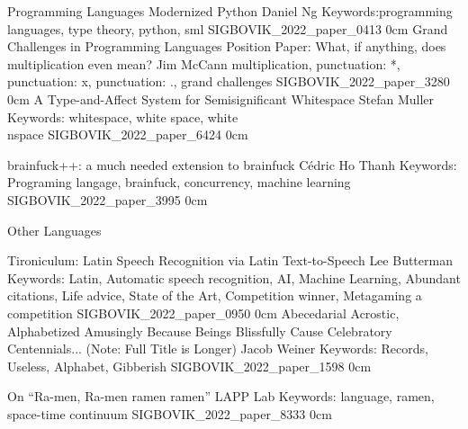 \renewcommand{\thepage}{\roman{page}}
\setcounter{page}{3}

\newpage
\renewcommand{\thepage}{\arabic{page}}
\setcounter{page}{1}

\newcommand{\link}[2][]{\vspace{-1in} {\scriptsize #1 \url{#2}} \raisebox{-0.5\height}{\texttt{[image: participation]}}}
\newcommand{\badge}[1]{\texttt{[image: badges/badge\_\#1]}}
\newcommand{\badges}[1]{\vspace{-1in} \raisebox{-0.5\height}{#1}}

\addtrack
    {}{Programming Languages}
\addpaper
    {Modernized Python}
    {Daniel Ng}
    {Keywords:programming languages, type theory, python, sml}
    {SIGBOVIK_2022_paper_0413}
    {0cm}
    {}
\addpaper
    {Grand Challenges in Programming Languages Position Paper: What, if anything, does multiplication even mean?}
    {Jim McCann}
    {multiplication, punctuation: *, punctuation: x, punctuation: ., grand challenges}
    {SIGBOVIK_2022_paper_3280}
    {0cm}
    {}
\addpaper
    {A Type-and-Affect System for Semisignificant Whitespace}
    {Stefan Muller}
    {Keywords: whitespace, white space, white\\nspace}
    {SIGBOVIK_2022_paper_6424}
    {0cm}
    {}

\addpaper
    {brainfuck++: a much needed extension to brainfuck}
    {Cédric Ho Thanh}
    {Keywords: Programing langage, brainfuck, concurrency, machine learning}
    {SIGBOVIK_2022_paper_3995}
    {0cm}
    {\badges{\badge{pagenumbers}}}

\addtrack
    {}{Other Languages}

\addpaper
    {Tironiculum: Latin Speech Recognition via Latin Text-to-Speech}
    {Lee Butterman}
    {Keywords: Latin, Automatic speech recognition, AI, Machine Learning, Abundant citations, Life advice, State of the Art, Competition winner, Metagaming a competition}
    {SIGBOVIK_2022_paper_0950}
    {0cm}
    {}
\addpaper
    {Abecedarial Acrostic, Alphabetized Amusingly Because Beings Blissfully Cause Celebratory Centennials... (Note: Full Title is Longer)}
    {Jacob Weiner}
    {Keywords: Records, Useless, Alphabet, Gibberish}
    {SIGBOVIK_2022_paper_1598}
    {0cm}
    {}

\addpaper
    {On ``Ra-men, Ra-men ramen ramen''}
    {LAPP Lab}
    {Keywords: language, ramen, space-time continuum}
    {SIGBOVIK_2022_paper_8333}
    {0cm}
    {}


